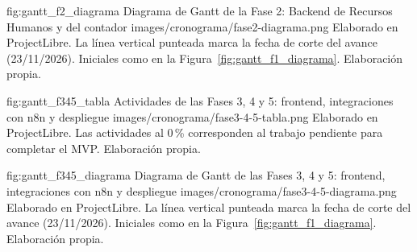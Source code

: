 \figuraEnTexto
    {fig:gantt_f2_diagrama}
    {Diagrama de Gantt de la Fase 2: Backend de Recursos Humanos y del contador}
    {images/cronograma/fase2-diagrama.png}
    {Elaborado en ProjectLibre. La línea vertical punteada marca la fecha de corte del avance (23/11/2026). Iniciales como en la Figura~\ref{fig:gantt_f1_diagrama}. Elaboración propia.}

\figuraEnTexto
    {fig:gantt_f345_tabla}
    {Actividades de las Fases 3, 4 y 5: frontend, integraciones con n8n y despliegue}
    {images/cronograma/fase3-4-5-tabla.png}
    {Elaborado en ProjectLibre. Las actividades al 0\,\% corresponden al trabajo pendiente para completar el MVP. Elaboración propia.}

\figuraEnTexto
    {fig:gantt_f345_diagrama}
    {Diagrama de Gantt de las Fases 3, 4 y 5: frontend, integraciones con n8n y despliegue}
    {images/cronograma/fase3-4-5-diagrama.png}
    {Elaborado en ProjectLibre. La línea vertical punteada marca la fecha de corte del avance (23/11/2026). Iniciales como en la Figura~\ref{fig:gantt_f1_diagrama}. Elaboración propia.}
